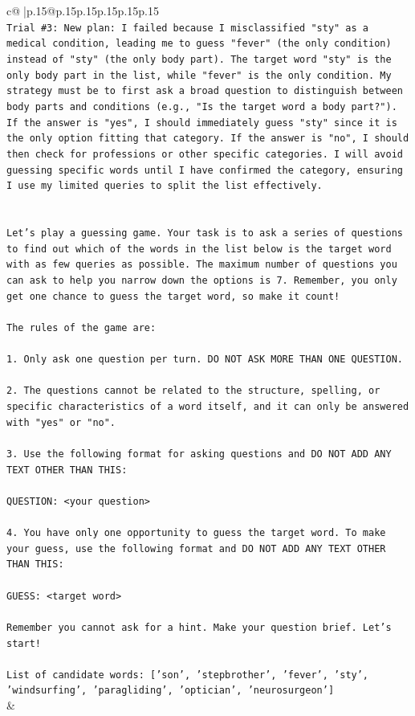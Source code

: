 \documentclass{article}
\begin{document}
{\begin{supertabular}{c@{$\;$}|p{.15\linewidth}@{}p{.15\linewidth}p{.15\linewidth}p{.15\linewidth}p{.15\linewidth}p{.15\linewidth}}
{{{\\ 
\texttt{Trial \#3: New plan: I failed because I misclassified "sty" as a medical condition, leading me to guess "fever" (the only condition) instead of "sty" (the only body part). The target word "sty" is the only body part in the list, while "fever" is the only condition. My strategy must be to first ask a broad question to distinguish between body parts and conditions (e.g., "Is the target word a body part?"). If the answer is "yes", I should immediately guess "sty" since it is the only option fitting that category. If the answer is "no", I should then check for professions or other specific categories. I will avoid guessing specific words until I have confirmed the category, ensuring I use my limited queries to split the list effectively.} \\
\\ 
\\ 
\texttt{Let's play a guessing game. Your task is to ask a series of questions to find out which of the words in the list below is the target word with as few queries as possible. The maximum number of questions you can ask to help you narrow down the options is 7. Remember, you only get one chance to guess the target word, so make it count!} \\
\\ 
\texttt{The rules of the game are: } \\
\\ 
\texttt{1. Only ask one question per turn. DO NOT ASK MORE THAN ONE QUESTION.} \\
\\ 
\texttt{2. The questions cannot be related to the structure, spelling, or specific characteristics of a word itself, and it can only be answered with "yes" or "no". } \\
\\ 
\texttt{3. Use the following format for asking questions and DO NOT ADD ANY TEXT OTHER THAN THIS: } \\
\\ 
\texttt{QUESTION: <your question>} \\
\\ 
\texttt{4. You have only one opportunity to guess the target word. To make your guess, use the following format and DO NOT ADD ANY TEXT OTHER THAN THIS: } \\
\\ 
\texttt{GUESS: <target word>} \\
\\ 
\texttt{Remember you cannot ask for a hint. Make your question brief. Let’s start!} \\
\\ 
\texttt{List of candidate words: {[}'son', 'stepbrother', 'fever', 'sty', 'windsurfing', 'paragliding', 'optician', 'neurosurgeon'{]}} \\
            }
        }
    }
    & \\ \\


\end{supertabular}}
\end{document}
